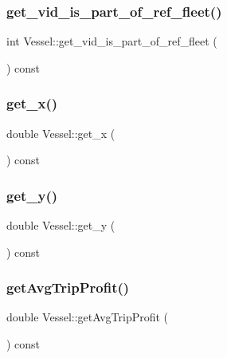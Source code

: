 \subsubsection{\texorpdfstring{get\_vid\_is\_part\_of\_ref\_fleet()}{get\_vid\_is\_part\_of\_ref\_fleet()}}
{\footnotesize\ttfamily int Vessel\+::get\+\_\+vid\+\_\+is\+\_\+part\+\_\+of\+\_\+ref\+\_\+fleet (\begin{DoxyParamCaption}{ }\end{DoxyParamCaption}) const}

\mbox{\label{class_vessel_a0289d65048051697e3196e6263c45f89}} 
\subsubsection{\texorpdfstring{get\_x()}{get\_x()}}
{\footnotesize\ttfamily double Vessel\+::get\+\_\+x (\begin{DoxyParamCaption}{ }\end{DoxyParamCaption}) const}

\mbox{\label{class_vessel_a1df8729ae670041c19a66d98dd00e07f}} 
\subsubsection{\texorpdfstring{get\_y()}{get\_y()}}
{\footnotesize\ttfamily double Vessel\+::get\+\_\+y (\begin{DoxyParamCaption}{ }\end{DoxyParamCaption}) const}

\mbox{\label{class_vessel_aca27d89d8d969b775f919d29109c53a8}} 
\subsubsection{\texorpdfstring{getAvgTripProfit()}{getAvgTripProfit()}}
{\footnotesize\ttfamily double Vessel\+::get\+Avg\+Trip\+Profit (\begin{DoxyParamCaption}{ }\end{DoxyParamCaption}) const\hspace{0.3cm}{\ttfamily [inline]}}

